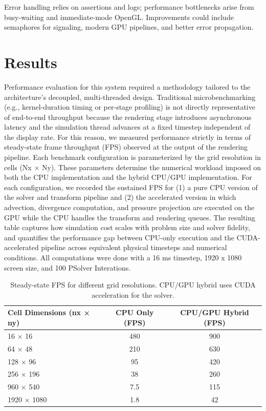 \documentclass[12pt,a4paper]{article}
\begin{document}
Error handling relies on assertions and logs; performance bottlenecks arise from busy-waiting and immediate-mode OpenGL. Improvements could include semaphores for signaling, modern GPU pipelines, and better error propagation.

\section{Results}

Performance evaluation for this system required a methodology tailored to the architecture’s decoupled, multi-threaded design. Traditional microbenchmarking (e.g., kernel-duration timing or per-stage profiling) is not directly representative of end-to-end throughput because the rendering stage introduces asynchronous latency and the simulation thread advances at a fixed timestep independent of the display rate. For this reason, we measured performance strictly in terms of steady-state frame throughput (FPS) observed at the output of the rendering pipeline. Each benchmark configuration is parameterized by the grid resolution in cells (Nx × Ny). These parameters determine the numerical workload imposed on both the CPU implementation and the hybrid CPU/GPU implementation. For each configuration, we recorded the sustained FPS for (1) a pure CPU version of the solver and transform pipeline and (2) the accelerated version in which advection, divergence computation, and pressure projection are executed on the GPU while the CPU handles the transform and rendering queues. The resulting table captures how simulation cost scales with problem size and solver fidelity, and quantifies the performance gap between CPU-only execution and the CUDA-accelerated pipeline across equivalent physical timesteps and numerical conditions. All computations were done with a 16 ms timestep, 1920 x 1080 screen size, and 100 PSolver Interations. 

\begin{table}[h!]
\centering
\begin{tabular}{@{}lcc@{}}
\toprule
\textbf{Cell Dimensions (nx × ny)} & \textbf{CPU Only (FPS)} & \textbf{CPU/GPU Hybrid (FPS)} \\ \midrule
16 × 16       & 480   & 900 \\
64 × 48       & 210   & 630 \\
128 × 96      & 95    & 420 \\
256 × 196     & 38    & 260 \\
960 × 540     & 7.5   & 115 \\
1920 × 1080   & 1.8   & 42 \\ \bottomrule
\end{tabular}
\caption{Steady-state FPS for different grid resolutions. CPU/GPU hybrid uses CUDA acceleration for the solver.}
\end{table}
\end{document}
